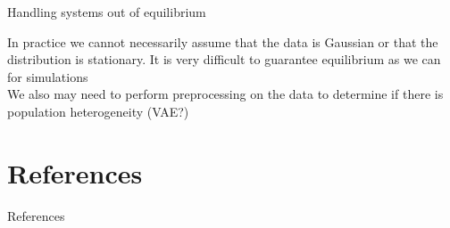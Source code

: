 \documentclass[aspectratio=1610]{beamer}					%
\begin{document}
\begin{frame}{Handling systems out of equilibrium}

In practice we cannot necessarily assume that the data is Gaussian or that the distribution is stationary. It is very difficult to guarantee equilibrium as we can for simulations\\
\vspace{0.2in}
We also may need to perform preprocessing on the data to determine if there is population heterogeneity (VAE?)

\end{frame}

\section{References}

\begin{frame}[allowframebreaks]{References}
	\tiny
	
\end{frame}
\end{document}
